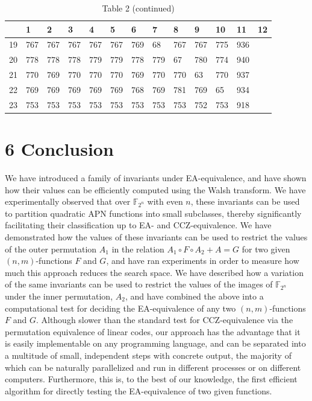 \documentclass[10pt]{article}
\begin{document}
\begin{table}[h]
\begin{center}
\captionsetup{labelformat=empty}
\caption{Table 2 (continued)}
\begin{tabular}{|l|l|l|l|l|l|l|l|l|l|l|l|l|}
\hline
 & 1 & 2 & 3 & 4 & 5 & 6 & 7 & 8 & 9 & 10 & 11 & 12 \\
\hline
19 & 767 & 767 & 767 & 767 & 767 & 769 & 68 & 767 & 767 & 775 & 936 &  \\
\hline
20 & 778 & 778 & 778 & 779 & 779 & 778 & 779 & 67 & 780 & 774 & 940 &  \\
\hline
21 & 770 & 769 & 770 & 770 & 770 & 769 & 770 & 770 & 63 & 770 & 937 &  \\
\hline
22 & 769 & 769 & 769 & 769 & 769 & 768 & 769 & 781 & 769 & 65 & 934 &  \\
\hline
23 & 753 & 753 & 753 & 753 & 753 & 753 & 753 & 753 & 752 & 753 & 918 &  \\
\hline
\end{tabular}
\end{center}
\end{table}

\section*{6 Conclusion}
We have introduced a family of invariants under EA-equivalence, and have shown how their values can be efficiently computed using the Walsh transform. We have experimentally observed that over $\mathbb{F}_{2^{n}}$ with even $n$, these invariants can be used to partition quadratic APN functions into small subclasses, thereby significantly facilitating their classification up to EA- and CCZ-equivalence. We have demonstrated how the values of these invariants can be used to restrict the values of the outer permutation $A_{1}$ in the relation $A_{1} \circ F \circ A_{2}+A=G$ for two given $(n, m)$-functions $F$ and $G$, and have ran experiments in order to measure how much this approach reduces the search space. We have described how a variation of the same invariants can be used to restrict the values of the images of $\mathbb{F}_{2^{n}}$ under the inner permutation, $A_{2}$, and have combined the above into a computational test for deciding the EA-equivalence of any two $(n, m)$-functions $F$ and $G$. Although slower than the standard test for CCZ-equivalence via the permutation equivalence of linear codes, our approach has the advantage that it is easily implementable on any programming language, and can be separated into a multitude of small, independent steps with concrete output, the majority of which can be naturally parallelized and run in different processes or on different computers. Furthermore, this is, to the best of our knowledge, the first efficient algorithm for directly testing the EA-equivalence of two given functions.
\end{document}
